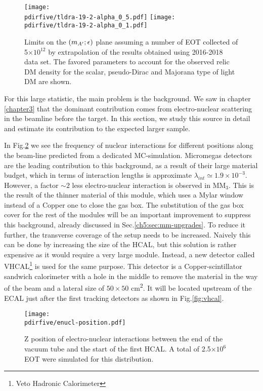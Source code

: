 \begin{figure}[bht!]
  \centering
  \texttt{[image: \\pdirfive/tldra-19-2-alpha\_0\_5.pdf]}
  \texttt{[image: \\pdirfive/tldra-19-2-alpha\_0\_1.pdf]}
  \caption[Sensitivity projection for invisible mode 2021]{Limits on the $(m_{A'};\epsilon)$ plane assuming a number of EOT collected of 5$\times 10^{12}$ by extrapolation of the results obtained using 2016-2018 data set. The favored parameters to account for the observed relic DM density for the scalar, pseudo-Dirac and Majorana type of light DM are shown.}
  \label{fig:dm-sens-proj}
\end{figure}

For this large statistic, the main problem is the background.  We saw in chapter \ref{chapter3} that the dominant contribution comes from electro-nuclear scattering in the beamline before the target. In this section, we study this source in detail and estimate its contribution to the expected larger sample.

In Fig.\ref{fig:enucl-position} we see the frequency of nuclear interactions for different positions along the beam-line predicted from a dedicated MC-simulation. Micromegas detectors are the leading contribution to this background, as a result of their large material budget, which in terms of interaction lengths is approximate $\lambda_{int} \simeq 1.9 \times 10^{-3}$. However, a factor $\sim 2$ less electro-nuclear interaction is observed in MM$_3$. This is the result of the thinner material of this module, which uses a Mylar window instead of a Copper one to close the gas box. The substitution of the gas box cover for the rest of the modules will be an important improvement to suppress this background, already discussed in Sec.\ref{ch5:sec:mm-upgrades}. To reduce it further, the transverse coverage of the setup needs to be increased. Naively this can be done by increasing the size of the HCAL, but this solution is rather expensive as it would require a very large module. Instead, a new detector called VHCAL\footnote{Veto Hadronic Calorimeter} is used for the same purpose. This detector is a Copper-scintillator sandwich calorimeter with a hole in the middle to remove the material in the way of the beam and a lateral size of $50\times50$ \si{\centi\meter\squared}. It will be located upstream of the ECAL just after the first tracking detectors as shown in Fig.\ref{fig:vhcal}.
\begin{figure}[bth!]
  \centering
  \texttt{[image: \\pdirfive/enucl-position.pdf]}
  \caption[electro-nuclear interaction position]{Z position of electro-nuclear interactions between the end of the vacuum tube and the start of the first HCAL. A total of 2.5$\times 10^6$ EOT were simulated for this distribution.}
  \label{fig:enucl-position}
\end{figure}

